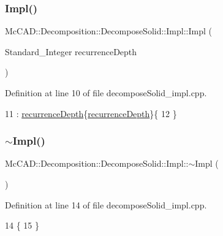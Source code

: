 \subsubsection{\texorpdfstring{Impl()}{Impl()}\hspace{0.1cm}{\footnotesize\ttfamily [2/4]}}
{\footnotesize\ttfamily Mc\+C\+A\+D\+::\+Decomposition\+::\+Decompose\+Solid\+::\+Impl\+::\+Impl (\begin{DoxyParamCaption}\item[{Standard\+\_\+\+Integer}]{recurrence\+Depth }\end{DoxyParamCaption})}



Definition at line 10 of file decompose\+Solid\+\_\+impl.\+cpp.


\begin{DoxyCode}
11     : \hyperlink{classMcCAD_1_1Decomposition_1_1DecomposeSolid_1_1Impl_ad908b2687b52f636d8368b814aa5f770}{recurrenceDepth}\{\hyperlink{classMcCAD_1_1Decomposition_1_1DecomposeSolid_1_1Impl_ad908b2687b52f636d8368b814aa5f770}{recurrenceDepth}\}\{
12 \}
\end{DoxyCode}
\mbox{\label{classMcCAD_1_1Decomposition_1_1DecomposeSolid_1_1Impl_af8f2e7a534dc2c7bb8d9553a3e6df4e2}} 
\subsubsection{\texorpdfstring{$\sim$\+Impl()}{~Impl()}\hspace{0.1cm}{\footnotesize\ttfamily [1/2]}}
{\footnotesize\ttfamily Mc\+C\+A\+D\+::\+Decomposition\+::\+Decompose\+Solid\+::\+Impl\+::$\sim$\+Impl (\begin{DoxyParamCaption}{ }\end{DoxyParamCaption})}



Definition at line 14 of file decompose\+Solid\+\_\+impl.\+cpp.


\begin{DoxyCode}
14                                            \{
15 \}
\end{DoxyCode}
\mbox{\label{classMcCAD_1_1Decomposition_1_1DecomposeSolid_1_1Impl_aa6127a34d15e303ba1f6759de099a2aa}} 
